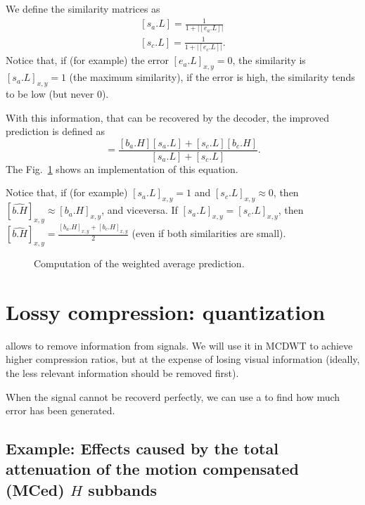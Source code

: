We define the similarity matrices as
\begin{equation}
  \begin{array}{l}
    {[s_a.L]} = \frac{1}{1+{|[e_a.L]|}}\\
    {[s_c.L]} = \frac{1}{1+{|[e_c.L]|}}.    
  \end{array}
  \label{eq:weighted_prediction}
\end{equation}
Notice that, if (for example) the error $[e_a.L]_{x,y}=0$, the
similarity is $[s_a.L]_{x,y}=1$ (the maximum similarity), if the error
is high, the similarity tends to be low (but never $0$).

With this information, that can be recovered by the decoder, the
improved prediction is defined as
\begin{equation}
  [\hat{b.H}] = \frac{[b_a.H][s_a.L]+[s_c.L][b_c.H]}{[s_a.L]+[s_c.L]}.
\end{equation}
The Fig.~\ref{fig:weighted_average} shows an implementation of this
equation.

Notice that, if (for example) $[s_a.L]_{x,y}=1$ and
$[s_c.L]_{x,y}\approx 0$, then
$[\hat{b.H}]_{x,y} \approx [b_a.H]_{x,y}$, and viceversa. If
$[s_a.L]_{x,y}=[s_c.L]_{x,y}$, then
$[\hat{b.H}]_{x,y}=\frac{[b_a.H]_{x,y}+[b_c.H]_{x,y}}{2}$ (even if both similarities are small).

\begin{figure}
  \centering 
  \caption{Computation of the weighted average prediction.}
  \label{fig:weighted_average}
\end{figure}


\section{Lossy compression: quantization}
 allows to remove information from
signals. We will use it in MCDWT to achieve higher compression ratios,
but at the expense of losing visual information (ideally, the less
relevant information should be removed first).

When the signal cannot be recoverd perfectly, we can use a
 to find how much error
has been generated.

\subsection*{Example: Effects caused by the total attenuation of the motion compensated (MCed) $H$ subbands}

